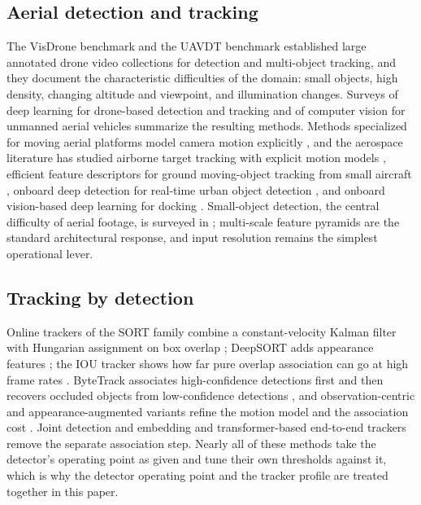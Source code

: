 \documentclass[journal]{new-aiaa}
\begin{document}
\subsection{Aerial detection and tracking}
The VisDrone benchmark \cite{zhu2022visdrone} and the UAVDT benchmark \cite{du2018uavdt} established large annotated drone video collections for detection and multi-object tracking, and they document the characteristic difficulties of the domain: small objects, high density, changing altitude and viewpoint, and illumination changes. Surveys of deep learning for drone-based detection and tracking \cite{wu2022uavsurvey} and of computer vision for unmanned aerial vehicles \cite{kanellakis2017uavvision} summarize the resulting methods. Methods specialized for moving aerial platforms model camera motion explicitly \cite{liu2022uavmot}, and the aerospace literature has studied airborne target tracking with explicit motion models \cite{miller2015multitarget}, efficient feature descriptors for ground moving-object tracking from small aircraft \cite{desai2017uavfeature}, onboard deep detection for real-time urban object detection \cite{lu2024uavdetection}, and onboard vision-based deep learning for docking \cite{choi2022docking}. Small-object detection, the central difficulty of aerial footage, is surveyed in \cite{cheng2023smallobject}; multi-scale feature pyramids \cite{lin2017fpn} are the standard architectural response, and input resolution remains the simplest operational lever.

\subsection{Tracking by detection}
Online trackers of the SORT family combine a constant-velocity Kalman filter \cite{kalman1960} with Hungarian assignment \cite{kuhn1955hungarian} on box overlap \cite{bewley2016sort}; DeepSORT adds appearance features \cite{wojke2017deepsort}; the IOU tracker shows how far pure overlap association can go at high frame rates \cite{bochinski2017iou}. ByteTrack associates high-confidence detections first and then recovers occluded objects from low-confidence detections \cite{zhang2022bytetrack}, and observation-centric and appearance-augmented variants refine the motion model and the association cost \cite{cao2023ocsort,maggiolino2023deepocsort,aharon2022botsort,du2023strongsort}. Joint detection and embedding \cite{zhang2021fairmot} and transformer-based end-to-end trackers \cite{zeng2022motr} remove the separate association step. Nearly all of these methods take the detector's operating point as given and tune their own thresholds against it, which is why the detector operating point and the tracker profile are treated together in this paper.
\end{document}
